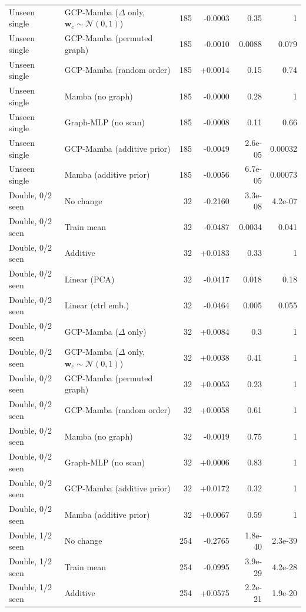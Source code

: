 \begin{longtable}{llrrrr}
Unseen single & GCP-Mamba ($\Delta$ only, $\mathbf{w}_c\sim\mathcal{N}(0,1)$) & 185 & -0.0003 & 0.35 & 1 \\
Unseen single & GCP-Mamba (permuted graph) & 185 & -0.0010 & 0.0088 & 0.079 \\
Unseen single & GCP-Mamba (random order) & 185 & +0.0014 & 0.15 & 0.74 \\
Unseen single & Mamba (no graph) & 185 & -0.0000 & 0.28 & 1 \\
Unseen single & Graph-MLP (no scan) & 185 & -0.0008 & 0.11 & 0.66 \\
Unseen single & GCP-Mamba (additive prior) & 185 & -0.0049 & 2.6e-05 & 0.00032 \\
Unseen single & Mamba (additive prior) & 185 & -0.0056 & 6.7e-05 & 0.00073 \\
\midrule
Double, 0/2 seen & No change & 32 & -0.2160 & 3.3e-08 & 4.2e-07 \\
Double, 0/2 seen & Train mean & 32 & -0.0487 & 0.0034 & 0.041 \\
Double, 0/2 seen & Additive & 32 & +0.0183 & 0.33 & 1 \\
Double, 0/2 seen & Linear (PCA) & 32 & -0.0417 & 0.018 & 0.18 \\
Double, 0/2 seen & Linear (ctrl emb.) & 32 & -0.0464 & 0.005 & 0.055 \\
Double, 0/2 seen & GCP-Mamba ($\Delta$ only) & 32 & +0.0084 & 0.3 & 1 \\
Double, 0/2 seen & GCP-Mamba ($\Delta$ only, $\mathbf{w}_c\sim\mathcal{N}(0,1)$) & 32 & +0.0038 & 0.41 & 1 \\
Double, 0/2 seen & GCP-Mamba (permuted graph) & 32 & +0.0053 & 0.23 & 1 \\
Double, 0/2 seen & GCP-Mamba (random order) & 32 & +0.0058 & 0.61 & 1 \\
Double, 0/2 seen & Mamba (no graph) & 32 & -0.0019 & 0.75 & 1 \\
Double, 0/2 seen & Graph-MLP (no scan) & 32 & +0.0006 & 0.83 & 1 \\
Double, 0/2 seen & GCP-Mamba (additive prior) & 32 & +0.0172 & 0.32 & 1 \\
Double, 0/2 seen & Mamba (additive prior) & 32 & +0.0067 & 0.59 & 1 \\
\midrule
Double, 1/2 seen & No change & 254 & -0.2765 & 1.8e-40 & 2.3e-39 \\
Double, 1/2 seen & Train mean & 254 & -0.0995 & 3.9e-29 & 4.2e-28 \\
Double, 1/2 seen & Additive & 254 & +0.0575 & 2.2e-21 & 1.9e-20 \\

\end{longtable}
